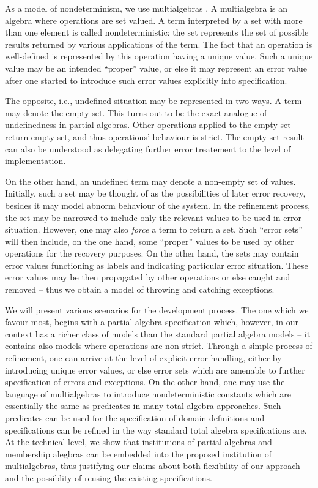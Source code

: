 \documentclass[10pt]{article}
\begin{document}
As a model of nondeterminism, we use multialgebras \cite{calc,multi}.
A multialgebra is an algebra where operations are set valued. A term
interpreted by a set with more than one element is called nondeterministic:
the set represents the set of possible results returned by various
applications of the term. 
The fact that an operation is well-defined is represented by this operation
having a unique value. Such a unique value may be an intended ``proper''
value, or else it may represent an error value after one started to introduce
such error values explicitly into specification.

The opposite, i.e., undefined situation may be represented in two ways. A
term may denote the empty set. This turns out to be the exact analogue of
undefinedness in partial algebras. Other operations applied to the empty set
return empty set, and thus operations' behaviour is strict. The empty set
result can also
be understood as delegating further error treatement to the level of
implementation. 

On the other hand, an undefined term may denote a non-empty set of values. Initially,
such a set may be thought of as the possibilities of later error recovery, besides it may model abnorm behaviour of the system. In
the refinement process, the set may be narrowed to include only the relevant
values to be used in error situation. However, one may also {\em force} a
term to return a set. Such ``error sets'' will then include, on the one hand,
some ``proper'' values to be used by other operations for the recovery
purposes. On the other hand, the sets may contain error values functioning as
labels and indicating particular error situation. These error values may be
then propagated by other operations or else caught and removed -- thus we
obtain a model of throwing and catching exceptions. 

We will present various scenarios for the development process. The one which
we favour most, begins with a partial algebra specification which, however,
in our context has a richer class of models than the standard partial algebra
models -- it contains also models where operations are non-strict. Through a
simple process of refinement, one can arrive at the level of explicit error
handling, either by introducing unique error values, or else error sets which
are amenable to further specification of errors and exceptions. 
On the other hand, one may use the language of multialgebras to introduce
nondeterministic constants which are essentially the same as predicates in many
total algebra approaches. Such predicates can be used for the specification
of domain definitions and specifications can be refined in the way standard
total algebra specifications are. At the technical level, we show that
institutions of partial algebras and membership alegbras can be embedded into
the proposed institution of multialgebras, thus justifying our claims about
both flexibility of our approach and the possiblity of reusing the existing
specifications.
\end{document}

